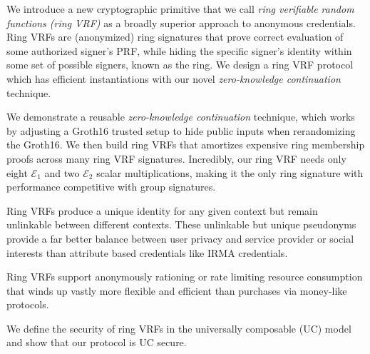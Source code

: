 
\def\eprintsmallskip{\smallskip}{}%
We introduce a new cryptographic primitive that we call \emph{ring verifiable random functions (ring VRF)} as a broadly superior approach to anonymous credentials.
Ring VRFs are (anonymized) ring signatures that prove correct evaluation
of some authorized signer's PRF, while hiding the specific signer's
identity within some set of possible signers, known as the ring. We design a ring VRF protocol which has efficient instantiations with our novel {\em zero-knowledge continuation} technique.

\eprintsmallskip
We demonstrate a reusable {\em zero-knowledge continuation} technique,
which works by adjusting a Groth16 trusted setup to hide public inputs
when rerandomizing the Groth16.  We then build ring VRFs that amortizes
expensive ring membership proofs across many ring VRF signatures.
%
Incredibly, our ring VRF needs only eight $\mathcal{E}_1$ and two
$\mathcal{E}_2$ scalar multiplications, making it the only ring signature
with performance competitive with group signatures.

\eprintsmallskip
Ring VRFs produce a unique identity for any given context but remain
unlinkable between different contexts.  These unlinkable but unique
pseudonyms provide a far better balance between user privacy and service
provider or social interests than attribute based credentials like IRMA credentials.

\eprintsmallskip
Ring VRFs support anonymously rationing or rate limiting resource
consumption that winds up vastly more flexible and efficient than
purchases via money-like protocols.

\eprintsmallskip
We define the security of ring VRFs in the universally composable (UC) model and show that our protocol is UC secure.
